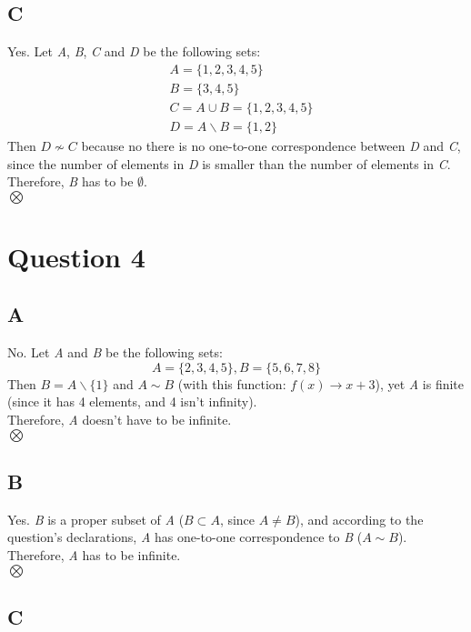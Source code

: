 \documentclass[12pt, oneside]{article}
\begin{document}
\subsection{C}
Yes. Let \emph{A}, \emph{B}, \emph{C} and \emph{D} be the following sets:
\begin{equation*}
\begin{split}
& A = \{1, 2, 3, 4, 5\}\\
& B = \{3, 4, 5\}\\
& C = A \cup B = \{1, 2, 3, 4, 5\}\\
& D = A \backslash B = \{1, 2\}
\end{split}
\end{equation*}
Then $D \nsim C$ because no there is no one-to-one correspondence between \emph{D} and \emph{C}, since the number of elements in \emph{D} is smaller than the number of elements in \emph{C}.\\
Therefore, \emph{B} has to be $\emptyset$.\\
$\bigotimes$
\clearpage

\section{Question 4}
\subsection{A}
No. Let \emph{A} and \emph{B} be the following sets:
\begin{equation*}
A = \{2, 3, 4, 5\}, B = \{5, 6, 7, 8\}
\end{equation*}
Then $B = A\backslash\{1\}$ and $A \sim B$ (with this function: $f(x) \rightarrow x + 3$), yet \emph{A} is finite (since it has 4 elements, and 4 isn't infinity).\\
Therefore, \emph{A} doesn't have to be infinite.\\
$\bigotimes$

\subsection{B}
Yes. \emph{B} is a proper subset of \emph{A} ($B \subset A$, since $A \neq B$), and according to the question's declarations, \emph{A} has one-to-one correspondence to \emph{B} ($A \sim B$).\\
Therefore, \emph{A} has to be infinite.\\
$\bigotimes$

\subsection{C}
\end{document}
